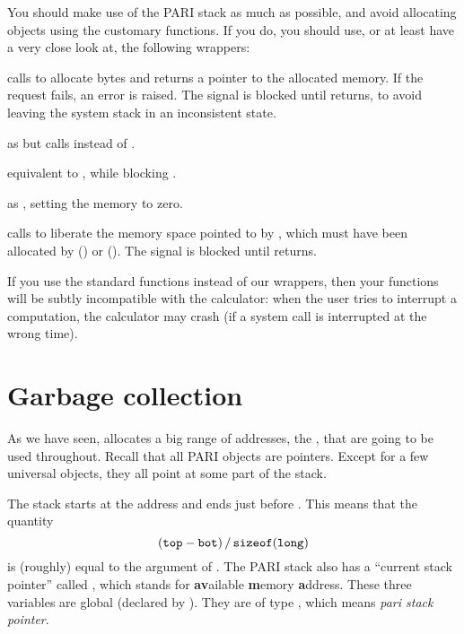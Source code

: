 You should make use of the PARI stack as much as possible, and avoid
allocating objects using the customary functions. If you do, you should
use, or at least have a very close look at, the following wrappers:

 calls  to allocate
 bytes and returns a pointer to the allocated memory. If the
request fails, an error is raised. The  signal is blocked until
 returns, to avoid leaving the system stack in an inconsistent
state.

 as  but
calls  instead of .

equivalent to , while blocking .

 as , setting the
memory to zero.

 calls  to liberate the memory
space pointed to by , which must have been allocated by 
() or  (). The 
signal is blocked until  returns.

If you use the standard  functions instead of our wrappers, then
your functions will be subtly incompatible with the  calculator: when
the user tries to interrupt a computation, the calculator may crash
(if a system call is interrupted at the wrong time).

\section{Garbage collection}\label{se:garbage}


\noindent
As we have seen,  allocates a big range of
addresses, the , that are going to be used throughout. Recall
that all PARI objects are pointers. Except for a few universal objects,
they all point at some part of the stack.

The stack starts at the address  and ends just before . This
means that the quantity
%
$$ ({\tt top} - {\tt bot})\,/\,{\tt sizeof(long)} $$
%
is (roughly) equal to the  argument of . The PARI
stack also has a ``current stack pointer'' called , which stands
for {\bf av}ailable {\bf m}emory {\bf a}ddress. These three variables are
global (declared by ). They are of type , which
means \emph{pari stack pointer}.

